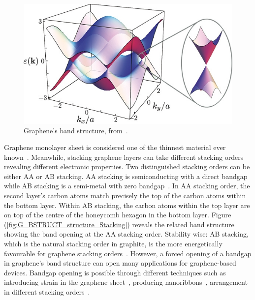 %
\begin{figure}
    \centering
    \includegraphics[width=\textwidth]{Figs/GrapheneBSTRUCT.png} %
    \caption{Graphene's band structure, from~\cite{dispersion}.}
    \label{fig:G_BSTRUCT_structure}
\end{figure}
%
Graphene monolayer sheet is considered one of the thinnest material ever known~\cite{Geim2007, Bunch2008}. Meanwhile, stacking graphene layers can take different stacking orders revealing different electronic properties. Two distinguished stacking orders can be either AA or AB stacking. AA stacking is semiconducting with a direct bandgap while AB stacking is a semi-metal with zero bandgap~\cite{Yakovkin2016}. In AA stacking order, the second layer's carbon atoms match precisely the top of the carbon atoms within the bottom layer. Within AB stacking, the carbon atoms within the top layer are on top of the centre of the honeycomb hexagon in the bottom layer. Figure (\ref{fig:G_BSTRUCT_structure_Stacking}) reveals the related band structure showing the band opening at the AA stacking order. Stability wise: AB stacking, which is the natural stacking order in graphite, is the more energetically favourable for graphene stacking orders~\cite{Yakovkin2016, Emroz2016, Cusati2017}. However, a forced opening of a bandgap in graphene's band structure can open many applications for graphene-based devices. Bandgap opening is possible through different techniques such as introducing strain in the graphene sheet~\cite{Zhen2008, Pereira2009, Cocco2010}, producing nanoribbons~\cite{Son2006, Han2007}, arrangement in different stacking orders~\cite{Ohta2006, Castro2007, Zhang2009}.
%
